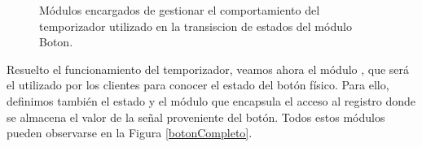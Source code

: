 \begin{figure}[H]
\caption{Módulos encargados de gestionar el comportamiento del temporizador utilizado en la transiscion de estados del módulo Boton.}
\label{modulosBoton}
\begin{center}
\end{center}
\end{figure}


Resuelto el funcionamiento del temporizador, veamos ahora el módulo \Boton, que será el utilizado por los clientes para conocer el estado del botón físico. Para ello, definimos también el estado y el módulo que encapsula el acceso al registro donde se almacena el valor de la señal proveniente del botón. Todos estos módulos pueden observarse en la Figura \ref{botonCompleto}.


